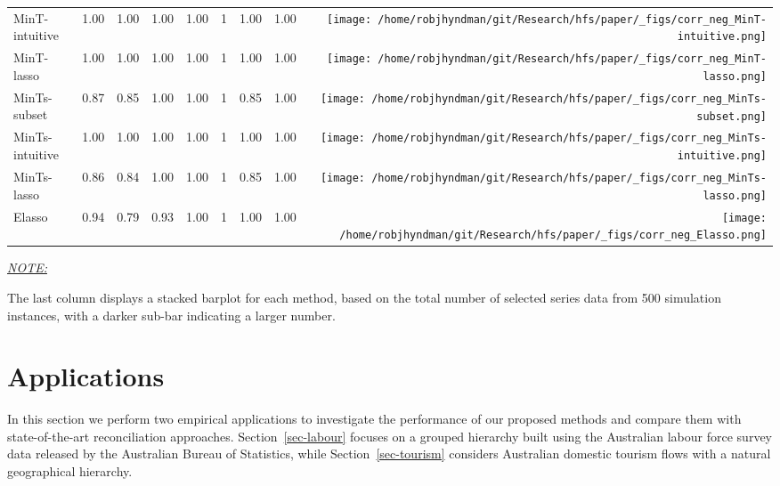 \documentclass[
  12pt,
  11pt]{article}
\begin{document}
\begin{table}[!h]
\begin{threeparttable}
\begin{tabular}{llrrrrrr>{}r}
MinT-intuitive & 1.00 & 1.00 & 1.00 & 1.00 & 1 & 1.00 & 1.00 & \texttt{[image: /home/robjhyndman/git/Research/hfs/paper/\_figs/corr\_neg\_MinT-intuitive.png]}\\
MinT-lasso & 1.00 & 1.00 & 1.00 & 1.00 & 1 & 1.00 & 1.00 & \texttt{[image: /home/robjhyndman/git/Research/hfs/paper/\_figs/corr\_neg\_MinT-lasso.png]}\\
\midrule
MinTs-subset & 0.87 & 0.85 & 1.00 & 1.00 & 1 & 0.85 & 1.00 & \texttt{[image: /home/robjhyndman/git/Research/hfs/paper/\_figs/corr\_neg\_MinTs-subset.png]}\\
MinTs-intuitive & 1.00 & 1.00 & 1.00 & 1.00 & 1 & 1.00 & 1.00 & \texttt{[image: /home/robjhyndman/git/Research/hfs/paper/\_figs/corr\_neg\_MinTs-intuitive.png]}\\
MinTs-lasso & 0.86 & 0.84 & 1.00 & 1.00 & 1 & 0.85 & 1.00 & \texttt{[image: /home/robjhyndman/git/Research/hfs/paper/\_figs/corr\_neg\_MinTs-lasso.png]}\\
\midrule
Elasso & 0.94 & 0.79 & 0.93 & 1.00 & 1 & 1.00 & 1.00 & \texttt{[image: /home/robjhyndman/git/Research/hfs/paper/\_figs/corr\_neg\_Elasso.png]}\\
\bottomrule
\end{tabular}
\begin{tablenotes}[para]
\item \underline{\textit{NOTE:}} 
\item The last column displays a stacked barplot for each method, based on the total number of selected series data from 500 simulation instances, with a darker sub-bar indicating a larger number.
\end{tablenotes}
\end{threeparttable}
\endgroup{}
\end{table}

\hypertarget{sec-applications}{%
\section{Applications}\label{sec-applications}}

In this section we perform two empirical applications to investigate the
performance of our proposed methods and compare them with
state-of-the-art reconciliation approaches. Section~\ref{sec-labour}
focuses on a grouped hierarchy built using the Australian labour force
survey data released by the Australian Bureau of Statistics, while
Section~\ref{sec-tourism} considers Australian domestic tourism flows
with a natural geographical hierarchy.
\end{document}
